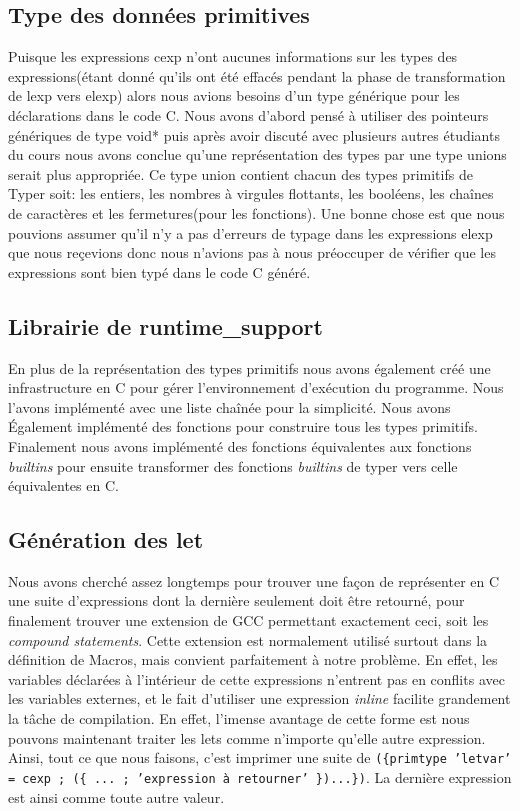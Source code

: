 \documentclass{article}
\begin{document}
\subsection{Type des données primitives}
Puisque les expressions cexp n'ont aucunes informations sur les types des 
expressions(étant donné qu'ils ont été effacés pendant la phase de 
transformation de lexp vers elexp) alors nous avions besoins d'un type
générique pour les déclarations dans le code C. Nous avons d'abord pensé à
utiliser des pointeurs génériques de type void* puis après avoir discuté avec
plusieurs autres étudiants du cours nous avons conclue qu'une représentation
des types par une type unions serait plus appropriée. Ce type union contient
chacun des types primitifs de Typer soit: les entiers, les nombres à virgules
flottants, les booléens, les chaînes de caractères et les fermetures(pour les
fonctions). Une bonne chose est que nous pouvions assumer qu'il n'y a pas
d'erreurs de typage dans les expressions elexp que nous reçevions donc nous
n'avions pas à nous préoccuper de vérifier que les expressions sont bien
typé dans le code C généré.

\subsection{Librairie de runtime\_support}
En plus de la représentation des types primitifs nous avons également créé
une infrastructure en C pour gérer l'environnement d'exécution du programme.
Nous l'avons implémenté avec une liste chaînée pour la simplicité. Nous avons
Également implémenté des fonctions pour construire tous les types primitifs.
Finalement nous avons implémenté des fonctions équivalentes aux fonctions
\textit{builtins} pour ensuite transformer des fonctions \textit{builtins}
de typer vers celle équivalentes en C.

\subsection{Génération des let}
Nous avons cherché assez longtemps pour trouver une façon de représenter en
C une suite d'expressions dont la dernière seulement doit être retourné, pour
finalement trouver une extension de GCC permettant exactement ceci, soit les
\emph{compound statements}\cite{gnu_statexprs}. Cette extension est normalement
utilisé surtout
dans la définition de Macros, mais convient parfaitement à notre problème.
En effet, les variables déclarées à l'intérieur de cette expressions n'entrent
pas en conflits avec les variables externes, et le fait d'utiliser une
expression \emph{inline} facilite grandement la tâche de compilation. En effet,
l'imense avantage de cette forme est nous pouvons maintenant traiter les lets
comme n'importe qu'elle autre expression. Ainsi, tout ce que nous faisons, c'est
imprimer une suite de \texttt{(\{primtype 'letvar' = cexp ; (\{ ... ;
  'expression à retourner' \})...\})}. La dernière expression est ainsi comme
toute autre valeur.
\end{document}
